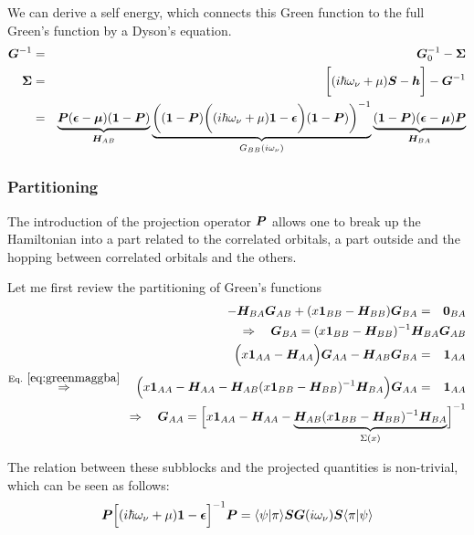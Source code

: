 \documentclass[11pt,a4paper]{report}
\begin{document}
We can derive a self energy, which connects this Green function to the
full Green's function by a Dyson's equation.
\begin{eqnarray}
\bm{G}^{-1}&=&\bm{G}^{-1}_0-\bm{\Sigma}
\nonumber\\
\bm{\Sigma}&=&\biggl[(i\hbar\omega_\nu+\mu)\bm{S}-\bm{h}\biggr]
-\bm{G}^{-1}
\nonumber\\
&=&\underbrace{\bm{P}(\bm{\epsilon}-\bm{\mu})(\bm{1}-\bm{P})}_{\bm{H}_{AB}}
\underbrace{
\biggl((\bm{1}-\bm{P})\biggl((i\hbar\omega_\nu+\mu)\bm{1}
-\bm{\epsilon}\biggr)(\bm{1}-\bm{P})
\biggr)^{-1}
}_{G_{BB}(i\omega_\nu)}
\underbrace{(\bm{1}-\bm{P})
(\bm{\epsilon}-\bm{\mu})\bm{P}}_{\bm{H}_{BA}}
\nonumber\\
\end{eqnarray}


\subsubsection{Partitioning}
The introduction of the projection operator $\bm{P}$ allows one to
break up the Hamiltonian into a part related to the correlated
orbitals, a part outside and the hopping between correlated orbitals
and the others.

Let me first review the partitioning of Green's functions
\begin{eqnarray}
-\mat{H}_{BA}\mat{G}_{AB}+(x\mat{1}_{BB}-\mat{H}_{BB})\mat{G}_{BA}&=&\mat{0}_{BA}
\nonumber
\\
&&\hspace{-9cm}\Rightarrow\quad
\mat{G}_{BA}=(x\mat{1}_{BB}-\mat{H}_{BB})^{-1}\mat{H}_{BA}\mat{G}_{AB}
\label{eq:greenmaggba}\\
\Bigl(x\mat{1}_{AA}-\mat{H}_{AA}\Bigr)\mat{G}_{AA}
-\mat{H}_{AB}\mat{G}_{BA}&=&\mat{1}_{AA}
\nonumber\\
\eqrel{eq:greenmaggba}{\Rightarrow}\quad
\Bigl(x\mat{1}_{AA}-\mat{H}_{AA}
-\mat{H}_{AB}
(x\mat{1}_{BB}-\mat{H}_{BB})^{-1}\mat{H}_{BA}\Bigr)\mat{G}_{AA}
&=&\mat{1}_{AA}
\nonumber\\
&&\hspace{-9cm}\Rightarrow\quad\mat{G}_{AA}=
\Bigl[x\mat{1}_{AA}-\mat{H}_{AA}
-\underbrace{\mat{H}_{AB}
(x\mat{1}_{BB}-\mat{H}_{BB})^{-1}\mat{H}_{BA}}_{\Sigma(x)}\Bigr]^{-1}
\end{eqnarray}

The relation between these subblocks and the projected quantities is
non-trivial, which can be seen as follows:
\begin{eqnarray}
\bm{P}\Bigl[(i\hbar\omega_\nu+\mu)\bm{1}-\bm{\epsilon}\Bigr]^{-1}\bm{P}
=\langle\psi|\pi\rangle\bm{S}\bm{G}(i\omega_\nu)\bm{S}\langle\pi|\psi\rangle
\end{eqnarray}
\end{document}
